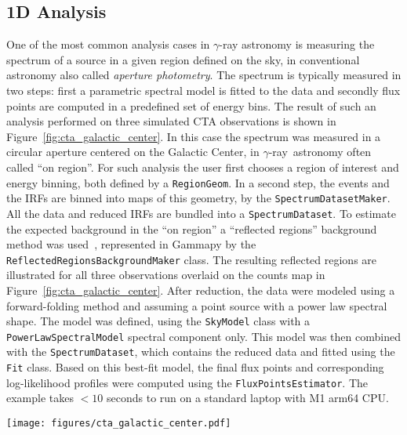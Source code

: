 \documentclass[longauth]{aa}
\newcommand{\code}[1]{\texttt{#1}}
\newcommand{\gammapy}{Gammapy\xspace}
\newcommand{\gammaray}{$\gamma$-ray\xspace}
\begin{document}
\subsection{1D Analysis}
\label{ssec:1d-analysis}
One of the most common analysis cases in \gammaray astronomy is measuring the
spectrum of a source in a given region defined on the sky, in conventional
astronomy also called \emph{aperture photometry}. The spectrum is typically measured
in two steps: first a parametric spectral model is fitted to the data and
secondly flux points are computed in a predefined set of energy bins. The
result of such an analysis performed on three simulated CTA observations is
shown in Figure~\ref{fig:cta_galactic_center}. In this case the spectrum was
measured in a circular aperture centered on the Galactic Center, in
\gammaray~astronomy often called \enquote{on region}. For such analysis the user first
chooses a region of interest and energy binning, both defined by a
\code{RegionGeom}. In a second step, the events and the IRFs are binned
into maps of this geometry, by the \code{SpectrumDatasetMaker}. All the data and
reduced IRFs are bundled into a \code{SpectrumDataset}. To estimate
the expected background in the \enquote{on region} a \enquote{reflected regions} background
method was used~\citep{Berge07}, represented in \gammapy by the
\code{ReflectedRegionsBackgroundMaker} class. The resulting reflected regions are
illustrated for all three observations overlaid on the counts map in Figure~\ref{fig:cta_galactic_center}.
After reduction, the data were modeled using a forward-folding method and assuming
a point source with a power law spectral shape. The model was defined, using
the \code{SkyModel} class with a \code{PowerLawSpectralModel} spectral component only.
This model was then combined with the \code{SpectrumDataset}, which contains the reduced data 
and fitted using the \code{Fit} class. Based on this best-fit model, the final flux points and corresponding
log-likelihood profiles were computed using the \code{FluxPointsEstimator}. The
example takes $<10$ seconds to run on a standard laptop with M1 arm64 CPU.

\begin{figure*}
        \centering
        \texttt{[image: figures/cta\_galactic\_center.pdf]}
        \caption{
                Example of a 1D spectral analysis of the Galactic Center for three simulated
                observations from the first CTA data challenge. The left image shows the maps of counts with the signal
                region in white and the reflected background regions for the three different observations
                overlaid in different colors. The right image shows the resulting spectral flux points and
                their corresponding log-likelihood profiles. The flux points are shown in orange, with the
                horizontal bar illustrating the width of the energy bin and the vertical bar the $1~\sigma$
                error. The log-likelihood profiles for each enetgy bin are shown in the background. The colormap
                illustrates the difference of the log-likelihood to the log-likelihood of the best fit value.
                }
        \label{fig:cta_galactic_center}
\end{figure*}
\end{document}
